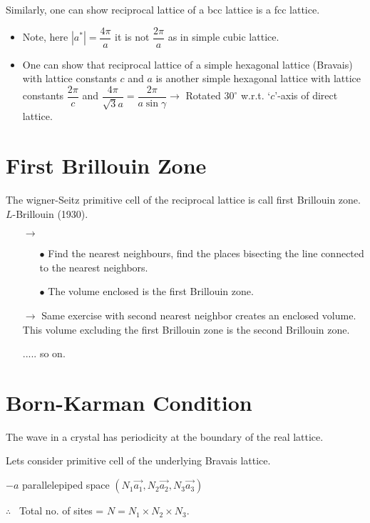 Similarly, one can show reciprocal lattice of a bcc lattice is a fcc lattice.
\begin{itemize}
\item Note, here $|a^{*}|=\dfrac{4\pi}{a}$ it is not $\dfrac{2\pi}{a}$ as in simple cubic lattice.

\item One can show that reciprocal lattice of a simple hexagonal lattice (Bravais) with lattice constants $c$ and $a$ is another simple hexagonal lattice with lattice constants $\dfrac{2\pi}{c}$ and $\dfrac{4\pi}{\sqrt{3}a}=\dfrac{2\pi}{a\sin \gamma}\to$ Rotated $30^{\circ}$ w.r.t. `$c$'-axis of direct lattice.
\end{itemize}

\section*{First Brillouin Zone}

The wigner-Seitz primitive cell of the reciprocal lattice is call first Brillouin zone. $L$-Brillouin (1930).
\begin{itemize}
\item[$\to$] 
\begin{itemize}
\item[$\bullet$] Find the nearest neighbours, find the places bisecting the line connected to the nearest neighbors.

\item[$\bullet$] The volume enclosed is the first Brillouin zone.
\end{itemize}
\item[$\to$] Same exercise with second nearest neighbor creates an enclosed volume. This volume excluding the first Brillouin zone is the second Brillouin zone.

..... so on.
\end{itemize}

\section*{Born-Karman Condition}

The wave in a crystal has periodicity at the boundary of the real lattice.

Lets consider primitive cell of the underlying Bravais lattice.

$-a$ parallelepiped space $(N_{1}\overrightarrow{a_{1}}, N_{2}\overrightarrow{a_{2}},N_{3}\overrightarrow{a_{3}})$

$\therefore$ \ Total no. of sites = $N=N_{1}\times N_{2}\times N_{3}$.

